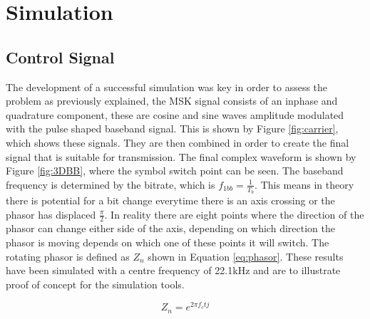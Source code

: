 \section{Simulation}
\subsection{Control Signal}
The development of a successful simulation was key in order to assess the problem as previously explained, the MSK signal consists of an inphase and quadrature component, these are cosine and sine waves amplitude modulated with the pulse shaped baseband signal. This is shown by Figure \ref{fig:carrier}, which shows these signals. 
They are then combined in order to create the final signal that is suitable for transmission. The final complex waveform is shown by Figure \ref{fig:3DBB}, where the symbol switch point can be seen. The baseband frequency is determined by the bitrate, which is $f_{1bb} = \frac{1}{T_b}$. This means in theory there is potential for a bit change everytime there is an axis crossing or the phasor has displaced $\frac{\pi}{2}$. In reality there are eight points where the direction of the phasor can change either side of the axis, depending on which direction the phasor is moving depends on which one of these points it will switch. The rotating phasor is defined as $Z_{n}$ shown in Equation \ref{eq:phasor}. These results have been simulated with a centre frequency of 22.1kHz and are to illustrate proof of concept for the simulation tools.

\begin{equation}
    Z_n = e^{2\pi f_{c}tj}
    \label{eq:phasor}
\end{equation}

